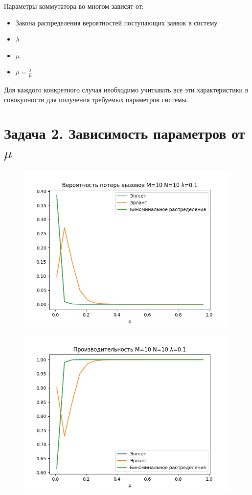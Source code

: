 \documentclass[12pt]{article}
\let\Oldsection\section
\renewcommand{\section}{\FloatBarrier\Oldsection}
\begin{document}
Параметры коммутатора во многом зависят от:
\begin{itemize}
	\item Закона распределения вероятностей поступающих заявок в систему
	\item $\lambda$
	\item $\mu$
	\item $\rho = \frac{\lambda}{\mu}$
\end{itemize}
Для каждого конкретного случая необходимо учитывать все эти характеристики в совокупности для получения требуемых параметров системы.

\section{Задача 2. Зависимость параметров от $\mu$}

\begin{figure}[!htb]
\centering
\includegraphics[scale=1.00]{assets/iss_2/loss_prob_M10_N10_lam01.png}
\caption{}
\label{}
\end{figure}

\begin{figure}[!htb]
\centering
\includegraphics[scale=1.00]{assets/iss_2/perf_M10_N10_lam01.png}
\caption{}
\label{}
\end{figure}
\end{document}
